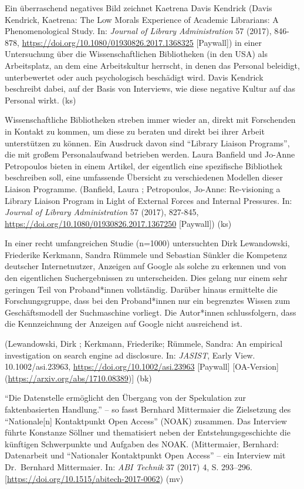 \documentclass[a4paper,
fontsize=11pt,
oneside,
numbers=noperiodatend,
parskip=half-,
bibliography=totoc,
final
]{scrartcl}
\begin{document}
Ein überraschend negatives Bild zeichnet Kaetrena Davis Kendrick (Davis
Kendrick, Kaetrena: The Low Morals Experience of Academic Librarians: A
Phenomenological Study. In: \emph{Journal of Library Administration} 57
(2017), 846-878, \url{https://doi.org/10.1080/01930826.2017.1368325}
{[}Paywall{]}) in einer Untersuchung über die Wissenschaftlichen
Bibliotheken (in den USA) als Arbeitsplatz, an dem eine Arbeitskultur
herrscht, in denen das Personal beleidigt, unterbewertet oder auch
psychologisch beschädigt wird. Davis Kendrick beschreibt dabei, auf der
Basis von Interviews, wie diese negative Kultur auf das Personal wirkt.
(ks)

Wissenschaftliche Bibliotheken streben immer wieder an, direkt mit
Forschenden in Kontakt zu kommen, um diese zu beraten und direkt bei
ihrer Arbeit unterstützen zu können. Ein Ausdruck davon sind
\enquote{Library Liaison Programs}, die mit großem Personalaufwand
betrieben werden. Laura Banfield und Jo-Anne Petropoulos bieten in einem
Artikel, der eigentlich eine spezifische Bibliothek beschreiben soll,
eine umfassende Übersicht zu verschiedenen Modellen dieser Liaison
Programme. (Banfield, Laura ; Petropoulos, Jo-Anne: Re-visioning a
Library Liaison Program in Light of External Forces and Internal
Pressures. In: \emph{Journal of Library Administration} 57 (2017),
827-845, \url{https://doi.org/10.1080/01930826.2017.1367250}
{[}Paywall{]}) (ks)

In einer recht umfangreichen Studie (n=1000) untersuchten Dirk
Lewandowski, Friederike Kerkmann, Sandra Rümmele und Sebastian Sünkler
die Kompetenz deutscher Internetnutzer, Anzeigen auf Google als solche
zu erkennen und von den eigentlichen Suchergebnissen zu unterscheiden.
Dies gelang nur einem sehr geringen Teil von Proband*innen vollständig.
Darüber hinaus ermittelte die Forschungsgruppe, dass bei den
Proband*innen nur ein begrenztes Wissen zum Geschäftsmodell der
Suchmaschine vorliegt. Die Autor*innen schlussfolgern, dass die
Kennzeichnung der Anzeigen auf Google nicht ausreichend ist.

(Lewandowski, Dirk ; Kerkmann, Friederike; Rümmele, Sandra: An empirical
investigation on search engine ad disclosure. In: \emph{JASIST}, Early
View. 10.1002/asi.23963, \url{https://doi.org/10.1002/asi.23963}
{[}Paywall{]}
{[}OA-Version{]}(\url{https://arxiv.org/abs/1710.08389}){]} (bk)

\enquote{Die Datenstelle ermöglicht den Übergang von der Spekulation zur
faktenbasierten Handlung.} -- so fasst Bernhard Mittermaier die
Zielsetzung des \enquote{Nationale{[}n{]} Kontaktpunkt Open Access}
(NOAK) zusammen. Das Interview führte Konstanze Söllner und thematisiert
neben der Entstehungsgeschichte die künftigen Schwerpunkte und Aufgaben
des NOAK. (Mittermaier, Bernhard: Datenarbeit und \enquote{Nationaler
Kontaktpunkt Open Access} -- ein Interview mit Dr.~Bernhard Mittermaier.
In: \emph{ABI Technik} 37 (2017) 4, S. 293--296.
{[}\url{https://doi.org/10.1515/abitech-2017-0062}) (mv)
\end{document}
